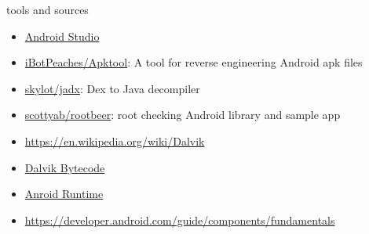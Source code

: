 \documentclass{beamer}
\begin{document}
\begin{frame}{tools and sources}

    \begin{itemize}
        \item \href{https://developer.android.com/studio}{Android Studio}
        \item \href{https://github.com/iBotPeaches/Apktool}{iBotPeaches/Apktool}:
              A tool for reverse engineering Android apk files
        \item \href{https://github.com/skylot/jadx}{skylot/jadx}: Dex to Java decompiler
        \item \href{https://github.com/scottyab/rootbeer}{scottyab/rootbeer}: root checking Android library and sample app
        \item \href{https://en.wikipedia.org/wiki/Dalvik}{https://en.wikipedia.org/wiki/Dalvik}
        \item \href{https://source.android.com/devices/tech/dalvik/dalvik-bytecode.html}{Dalvik Bytecode}
        \item \href{https://source.android.com/devices/architecture/modular-system/art}{Anroid Runtime}
        \item \href{https://developer.android.com/guide/components/fundamentals}{https://developer.android.com/guide/components/fundamentals}
    \end{itemize}

\end{frame}
\end{document}
